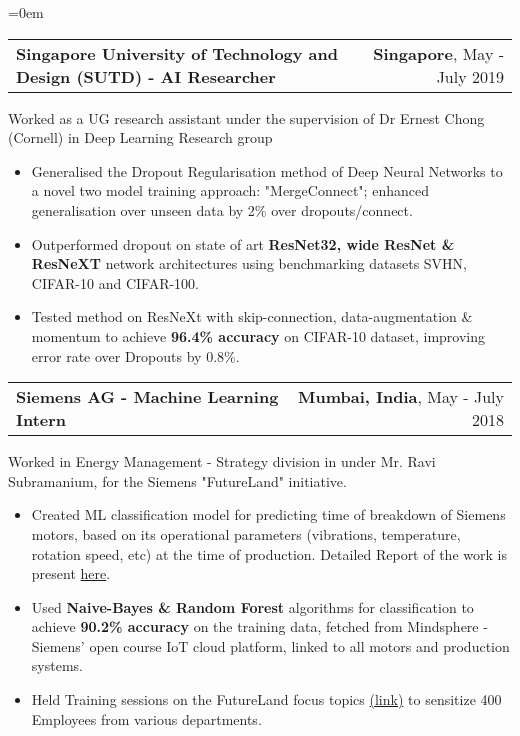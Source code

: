 \documentclass{article}
\makeatletter
\newcommand{\headerrow}[2]
{\begin{tabular*}{\linewidth}{l@{\extracolsep{\fill}}r}
	#1 &
	#2 \\
\end{tabular*}}
\makeatother
\begin{document}
\begin{list} {}{\leftmargin=0em}
    \item[]
    \headerrow {\textbf{Singapore University of Technology and Design (SUTD) - AI Researcher }}{\textbf{Singapore}, May - July 2019}
    Worked as a UG research assistant under the supervision of Dr Ernest Chong (Cornell) in Deep Learning Research group
    \begin{itemize}
    \setlength\itemsep{0.0em}
        \item Generalised the Dropout Regularisation method of Deep Neural Networks to a novel two model training approach: "MergeConnect"; enhanced generalisation over unseen data by 2\% over dropouts/connect.
        \item Outperformed dropout on state of art \textbf{ResNet32, wide ResNet \& ResNeXT} network architectures using benchmarking datasets SVHN, CIFAR-10 and CIFAR-100.
        \item Tested method on ResNeXt with skip-connection, data-augmentation \& momentum to achieve \textbf{96.4\% accuracy} on CIFAR-10 dataset, improving error rate over Dropouts by 0.8\%.
    \end{itemize}
    
    \item[]
    \headerrow {\textbf{Siemens AG - Machine Learning Intern}}{\textbf{Mumbai, India}, May - July 2018}
    Worked in Energy Management - Strategy division in under Mr. Ravi Subramanium, for the Siemens "FutureLand" initiative.
    \begin{itemize}
    \setlength\itemsep{0.0em}
        \item Created ML classification model for predicting time of breakdown of Siemens motors, based on its operational parameters (vibrations, temperature, rotation speed, etc) at the time of production. Detailed Report of the work is present \href{https://csciitd-my.sharepoint.com/:b:/g/personal/ee1170938_iitd_ac_in/EasUavDrTmdFrvuYc0rOissBVQwKuqxzharpOhXpblIN2Q?e=KJ8fPM}{here}.
        \item Used \textbf{Naive-Bayes \& Random Forest} algorithms for classification to achieve \textbf{90.2\% accuracy} on the training data, fetched from Mindsphere - Siemens' open course IoT cloud platform, linked to all motors and production systems.
        \item Held Training sessions on the FutureLand focus topics \href{https://www.siemens.com/global/en/home/company/fairs-events/futureland.html}{(link)} to sensitize 400 Employees from various departments.
    \end{itemize}
    

\end{list}
\end{document}
